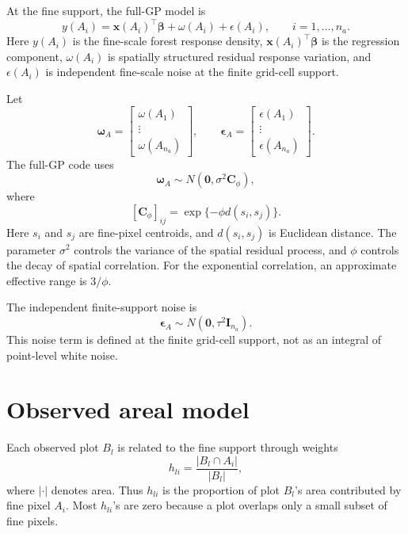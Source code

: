 \documentclass[11pt]{article}
\newcommand{\bsx}{\bm{x}}
\newcommand{\bsb}{\bm{\beta}}
\newcommand{\bsw}{\bm{\omega}}
\newcommand{\bse}{\bm{\epsilon}}
\begin{document}
At the fine support, the full-GP model is
\begin{equation}
y(A_i)
=
\bsx(A_i)^\top\bsb
+
\omega(A_i)
+
\epsilon(A_i),
\qquad i=1,\ldots,n_a.
\label{eq:fine_model}
\end{equation}
Here $y(A_i)$ is the fine-scale forest response density, $\bsx(A_i)^\top\bsb$ is the regression component, $\omega(A_i)$ is spatially structured residual response variation, and $\epsilon(A_i)$ is independent fine-scale noise at the finite grid-cell support.

Let
\begin{equation}
\bsw_A =
\begin{bmatrix}
\omega(A_1)\\
\vdots\\
\omega(A_{n_a})
\end{bmatrix},
\qquad
\bse_A =
\begin{bmatrix}
\epsilon(A_1)\\
\vdots\\
\epsilon(A_{n_a})
\end{bmatrix}.
\label{eq:w_e_vectors}
\end{equation}
The full-GP code uses
\begin{equation}
\bsw_A \sim N(\bm{0},\sigma^2 \bm{C}_{\phi}),
\label{eq:wA_prior}
\end{equation}
where
\begin{equation}
\left[\bm{C}_{\phi}\right]_{ij}
=
\exp\{-\phi d(s_i,s_j)\}.
\label{eq:full_exp_cor}
\end{equation}
Here $s_i$ and $s_j$ are fine-pixel centroids, and $d(s_i,s_j)$ is Euclidean distance. The parameter $\sigma^2$ controls the variance of the spatial residual process, and $\phi$ controls the decay of spatial correlation. For the exponential correlation, an approximate effective range is $3/\phi$.

The independent finite-support noise is
\begin{equation}
\bse_A \sim N(\bm{0},\tau^2\bm{I}_{n_a}).
\label{eq:eA_prior}
\end{equation}
This noise term is defined at the finite grid-cell support, not as an integral of point-level white noise.

\section{Observed areal model}

Each observed plot $B_l$ is related to the fine support through weights
\begin{equation}
h_{li}
=
\frac{|B_l \cap A_i|}{|B_l|},
\label{eq:hli}
\end{equation}
where $|\cdot|$ denotes area. Thus $h_{li}$ is the proportion of plot $B_l$'s area contributed by fine pixel $A_i$. Most $h_{li}$'s are zero because a plot overlaps only a small subset of fine pixels.
\end{document}
